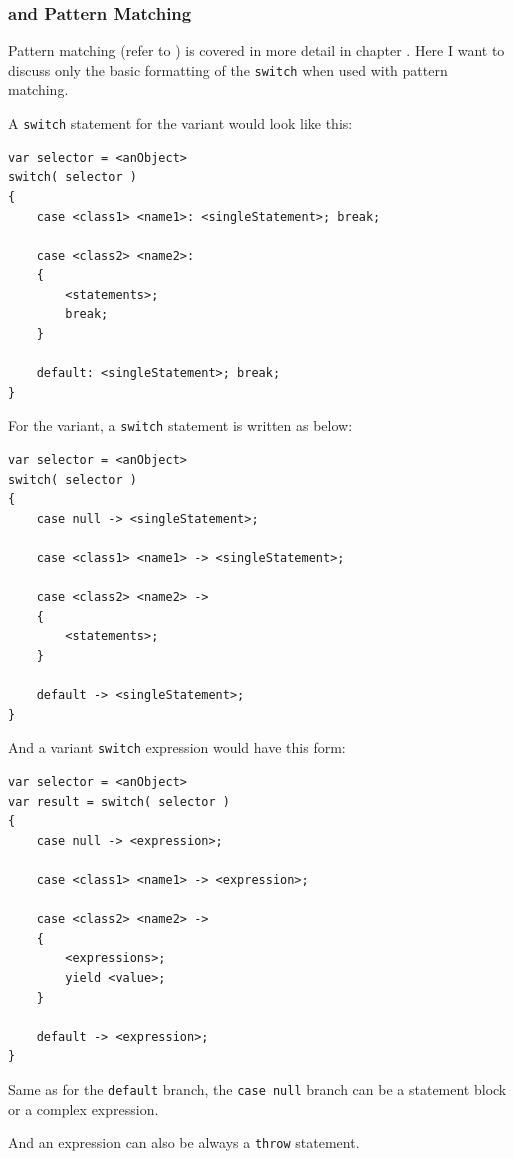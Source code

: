 \subsubsection{ and Pattern Matching}\label{sec:PatternMatchingSwitch}
Pattern matching (refer to \autocite{ORACLE_DOC_PATTERNMATCHING}) is covered in more detail in chapter . Here I want to discuss only the basic formatting of the \lstinline|switch| when used with pattern matching.

A \lstinline|switch| statement for the  variant would look like this:
\begin{lstlisting}
var selector = <anObject>
switch( selector )
{
    case <class1> <name1>: <singleStatement>; break;

    case <class2> <name2>:
    {
        <statements>;
        break;
    }

    default: <singleStatement>; break;
}
\end{lstlisting}

For the  variant, a \lstinline|switch| statement is written as below:
\begin{lstlisting}
var selector = <anObject>
switch( selector )
{
    case null -> <singleStatement>;
    
    case <class1> <name1> -> <singleStatement>;

    case <class2> <name2> ->
    {
        <statements>;
    }

    default -> <singleStatement>;
}
\end{lstlisting}

And a  variant \lstinline|switch| expression would have this form:
\begin{lstlisting}
var selector = <anObject>
var result = switch( selector )
{
    case null -> <expression>;

    case <class1> <name1> -> <expression>;

    case <class2> <name2> ->
    {
        <expressions>;
        yield <value>;
    }

    default -> <expression>;
}
\end{lstlisting}

Same as for the \lstinline|default| branch, the \lstinline|case null|  branch can be a statement block or a complex expression.

And an expression can also be always a \lstinline|throw| statement.



